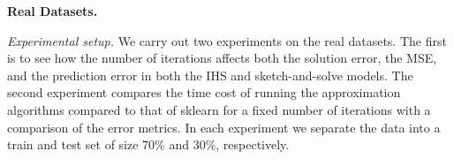 \textbf{Real Datasets.}

\textit{Experimental setup.}
We carry out two experiments on the real datasets.
The first is to see how the number of iterations affects both the solution error,
the MSE, and the prediction error in both the IHS and sketch-and-solve models.
The second experiment compares the time cost of running the approximation
algorithms compared to that of sklearn for a fixed number of iterations with
a comparison of the error metrics.
In each experiment we separate the data into a train and test set of size 70\%
and 30\%, respectively.
